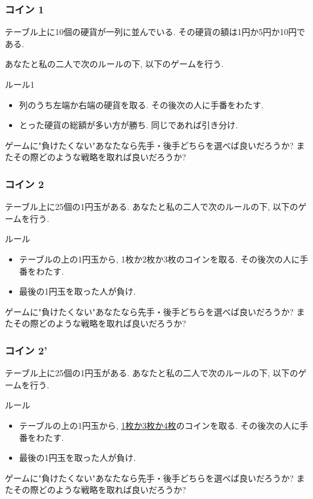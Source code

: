 \documentclass[11pt,dvipdfmx]{beamer}
\theoremstyle{definition}
\theoremstyle{remark}
\begin{document}
\begin{frame}
\frametitle{コイン 1}
テーブル上に10個の硬貨が一列に並んでいる. 
その硬貨の額は1円か5円か10円である. 

あなたと私の二人で次のルールの下, 以下のゲームを行う.

 \begin{block}{ルール1}
\begin{itemize}
\item 列のうち左端か右端の硬貨を取る. その後次の人に手番をわたす.
\item とった硬貨の総額が多い方が勝ち. 同じであれば引き分け. 
\end{itemize}
   \end{block}

ゲームに"負けたくない"あなたなら先手・後手どちらを選べば良いだろうか?
またその際どのような戦略を取れば良いだろうか?
\end{frame}


\begin{frame}
\frametitle{コイン 2}
テーブル上に25個の1円玉がある.
あなたと私の二人で次のルールの下, 以下のゲームを行う.

 \begin{block}{ルール}
\begin{itemize}
\item テーブルの上の1円玉から, 1枚か2枚か3枚のコインを取る. その後次の人に手番をわたす.
\item 最後の1円玉を取った人が負け.
\end{itemize}
   \end{block}

ゲームに"負けたくない"あなたなら先手・後手どちらを選べば良いだろうか?
またその際どのような戦略を取れば良いだろうか?

\end{frame}

\begin{frame}
\frametitle{コイン 2'}
テーブル上に25個の1円玉がある.
あなたと私の二人で次のルールの下, 以下のゲームを行う.

 \begin{block}{ルール}
\begin{itemize}
\item テーブルの上の1円玉から, \underline{1枚か3枚か4枚}のコインを取る. その後次の人に手番をわたす.
\item 最後の1円玉を取った人が負け.
\end{itemize}
   \end{block}

ゲームに"負けたくない"あなたなら先手・後手どちらを選べば良いだろうか?
またその際どのような戦略を取れば良いだろうか?

\end{frame}
\end{document}
